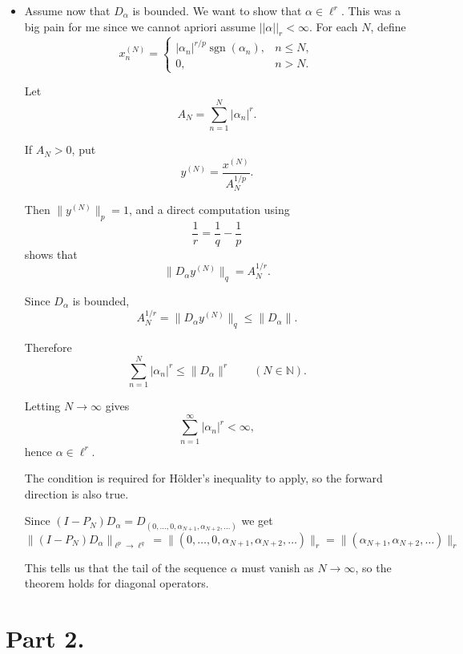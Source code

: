 \documentclass[10pt]{article}
\begin{document}
\begin{itemize}
\item Assume now that $D_\alpha$ is bounded. We want to show that $\alpha \in \ell^r$.
This was a big pain for me since we cannot apriori assume $||\alpha||_r < \infty$.
For each $N$, define
\[
x^{(N)}_n=
\begin{cases}
|\alpha_n|^{r/p}\operatorname{sgn}(\alpha_n), & n\le N,\\
0,& n>N.
\end{cases}
\]

Let
\[
A_N=\sum_{n=1}^N |\alpha_n|^r.
\]

If $A_N>0$, put
\[
y^{(N)}=\frac{x^{(N)}}{A_N^{1/p}}.
\]

Then $\|y^{(N)}\|_p=1$, and a direct computation using
\[
\frac1r=\frac1q-\frac1p
\]
shows that
\[
\|D_\alpha y^{(N)}\|_q=A_N^{1/r}.
\]

Since $D_\alpha$ is bounded,
\[
A_N^{1/r}
=
\|D_\alpha y^{(N)}\|_q
\le
\|D_\alpha\|.
\]

Therefore
\[
\sum_{n=1}^N |\alpha_n|^r
\le
\|D_\alpha\|^r
\qquad (N\in\mathbb N).
\]

Letting $N\to\infty$ gives
\[
\sum_{n=1}^\infty |\alpha_n|^r<\infty,
\]
hence $\alpha\in\ell^r$.

The condition is required for H\"older's inequality to apply, so the forward direction is also true.

Since $(I - P_N)D_\alpha = D_{(0,\ldots,0, \alpha_{N+1}, \alpha_{N+2}, \ldots)}$ we get
\[
\|(I - P_N)D_\alpha\|_{\ell^p \to \ell^q} = \|(0, \dots, 0, \alpha_{N+1}, \alpha_{N+2}, \dots)\|_r = \|(\alpha_{N+1}, \alpha_{N+2}, \dots)\|_r
\]

This tells us that the tail of the sequence $\alpha$ must vanish as $N \to \infty$, so the theorem holds for diagonal operators.

\end{itemize}

\section*{Part 2.}
\end{document}
